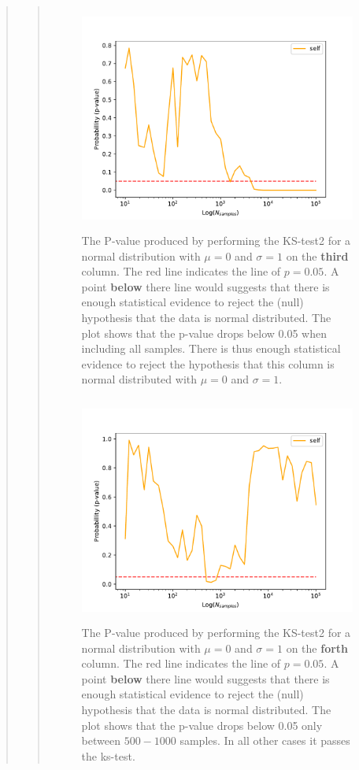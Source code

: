\begin{quote}
\begin{quote}
\begin{figure}[!ht]
\centering
\includegraphics[width=12cm, height=7.5cm]{./Plots/1e_plot_column_2.pdf}
\caption{The P-value produced by performing the KS-test2 for a normal distribution with $\mu = 0$ and $\sigma = 1$ on the \textbf{third} column.  The red line indicates the line of $ p = 0.05$. A point \textbf{below} there  line would suggests that there is enough statistical evidence to reject the (null) hypothesis that the data is normal distributed. The plot shows that the p-value drops below 0.05 when including all samples. There is thus enough statistical evidence to reject the hypothesis that this column is normal distributed with $\mu = 0$ and $\sigma = 1$.}
\end{figure}

\begin{figure}[!ht]
\centering
\includegraphics[width=12cm, height=7.5cm]{./Plots/1e_plot_column_3.pdf}
\caption{The P-value produced by performing the KS-test2 for a normal distribution with $\mu = 0$ and $\sigma = 1$ on the \textbf{forth} column.  The red line indicates the line of $ p = 0.05$. A point \textbf{below} there  line would suggests that there is enough statistical evidence to reject the (null) hypothesis that the data is normal distributed. The plot shows that the p-value drops below 0.05 only between $500-1000$ samples. In all other cases it passes the ks-test. }
\end{figure}
\newpage


\end{quote}
\end{quote}
